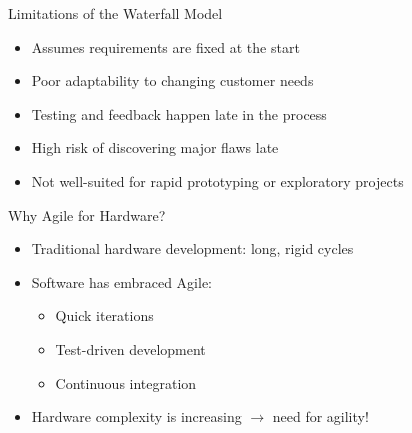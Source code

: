 \begin{frame}{Limitations of the Waterfall Model}
\begin{itemize}
    \item Assumes requirements are fixed at the start
    \item Poor adaptability to changing customer needs
    \item Testing and feedback happen late in the process
    \item High risk of discovering major flaws late
    \item Not well-suited for rapid prototyping or exploratory projects
\end{itemize}
\end{frame}


\begin{frame}{Why Agile for Hardware?}
\begin{itemize}
    \item Traditional hardware development: long, rigid cycles
    \item Software has embraced Agile:
    \begin{itemize}
        \item Quick iterations
        \item Test-driven development
        \item Continuous integration
    \end{itemize}
    \item Hardware complexity is increasing $\rightarrow$ need for agility!
\end{itemize}
\end{frame}

